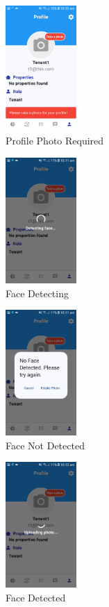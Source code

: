 \documentclass[sigconf]{acmart}
\begin{document}
\begin{figure}[h]
  \centering
  \includegraphics[width=0.24\textwidth]{RequireProfilePhoto.jpg}
  \caption{Profile Photo Required}
  \label{fig:RequireProfilePhoto}
\end{figure}
\begin{figure}[h]
  \centering
  \includegraphics[width=0.24\textwidth]{faceDetecting.jpg}
  \caption{Face Detecting}
  \label{fig:faceDetecting}
\end{figure}
\begin{figure}[h]
  \centering
  \includegraphics[width=0.24\textwidth]{faceCheckFailed.jpg}
  \caption{Face Not Detected}
  \label{fig:noFace}
\end{figure}
\begin{figure}[h]
  \centering
  \includegraphics[width=0.24\textwidth]{faceCheckSuccess.jpg}
  \caption{Face Detected}
  \label{fig:faceCheckSuccess}
\end{figure}
\end{document}
